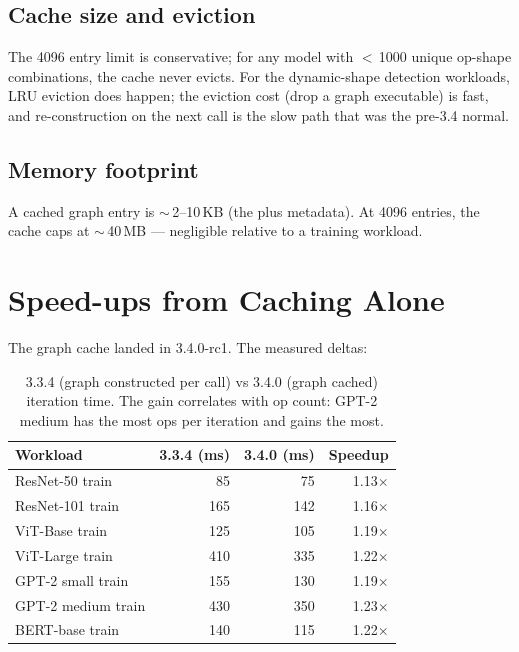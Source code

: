 \subsection{Cache size and eviction}
\label{ssec:mpsgraph_dispatch:cache_eviction}

The 4096 entry limit is conservative; for any model with
$<$\,1000 unique op-shape combinations, the cache never evicts.
For the dynamic-shape detection workloads, LRU eviction does
happen; the eviction cost (drop a graph executable) is fast,
and re-construction on the next call is the slow path that was
the pre-3.4 normal.

\subsection{Memory footprint}
\label{ssec:mpsgraph_dispatch:cache_memory}

A cached graph entry is $\sim$\,2--10\,KB (the
 plus metadata). At 4096 entries, the
cache caps at $\sim$\,40\,MB --- negligible relative to a
training workload.

\section{Speed-ups from Caching Alone}
\label{sec:mpsgraph_dispatch:cache_speedups}

The graph cache landed in 3.4.0-rc1. The measured deltas:

\begin{table}[t]
\centering
\small
\begin{tabular}{lrrr}
\toprule
Workload & 3.3.4 (ms) & 3.4.0 (ms) & Speedup \\
\midrule
ResNet-50 train       & 85  & 75  & 1.13$\times$ \\
ResNet-101 train      & 165 & 142 & 1.16$\times$ \\
ViT-Base train        & 125 & 105 & 1.19$\times$ \\
ViT-Large train       & 410 & 335 & 1.22$\times$ \\
GPT-2 small train     & 155 & 130 & 1.19$\times$ \\
GPT-2 medium train    & 430 & 350 & 1.23$\times$ \\
BERT-base train       & 140 & 115 & 1.22$\times$ \\
\bottomrule
\end{tabular}
\caption[Graph-cache speedups.]{3.3.4 (graph constructed per
call) vs 3.4.0 (graph cached) iteration time. The gain
correlates with op count: GPT-2 medium has the most ops per
iteration and gains the most.}
\label{tab:mpsgraph_dispatch:cache_speedups}
\end{table}

